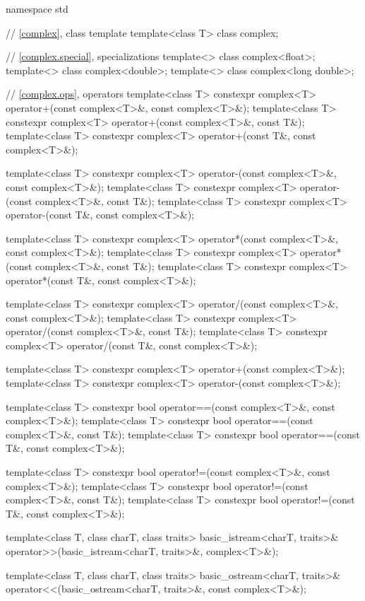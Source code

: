 %
\begin{codeblock}
namespace std {
  // \ref{complex}, class template 
  template<class T> class complex;

  // \ref{complex.special},  specializations
  template<> class complex<float>;
  template<> class complex<double>;
  template<> class complex<long double>;

  // \ref{complex.ops}, operators
  template<class T> constexpr complex<T> operator+(const complex<T>&, const complex<T>&);
  template<class T> constexpr complex<T> operator+(const complex<T>&, const T&);
  template<class T> constexpr complex<T> operator+(const T&, const complex<T>&);

  template<class T> constexpr complex<T> operator-(const complex<T>&, const complex<T>&);
  template<class T> constexpr complex<T> operator-(const complex<T>&, const T&);
  template<class T> constexpr complex<T> operator-(const T&, const complex<T>&);

  template<class T> constexpr complex<T> operator*(const complex<T>&, const complex<T>&);
  template<class T> constexpr complex<T> operator*(const complex<T>&, const T&);
  template<class T> constexpr complex<T> operator*(const T&, const complex<T>&);

  template<class T> constexpr complex<T> operator/(const complex<T>&, const complex<T>&);
  template<class T> constexpr complex<T> operator/(const complex<T>&, const T&);
  template<class T> constexpr complex<T> operator/(const T&, const complex<T>&);

  template<class T> constexpr complex<T> operator+(const complex<T>&);
  template<class T> constexpr complex<T> operator-(const complex<T>&);

  template<class T> constexpr bool operator==(const complex<T>&, const complex<T>&);
  template<class T> constexpr bool operator==(const complex<T>&, const T&);
  template<class T> constexpr bool operator==(const T&, const complex<T>&);

  template<class T> constexpr bool operator!=(const complex<T>&, const complex<T>&);
  template<class T> constexpr bool operator!=(const complex<T>&, const T&);
  template<class T> constexpr bool operator!=(const T&, const complex<T>&);

  template<class T, class charT, class traits>
    basic_istream<charT, traits>& operator>>(basic_istream<charT, traits>&, complex<T>&);

  template<class T, class charT, class traits>
    basic_ostream<charT, traits>& operator<<(basic_ostream<charT, traits>&, const complex<T>&);

}
\end{codeblock}

